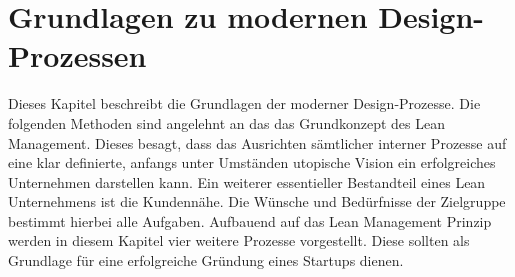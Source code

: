 \chapter{Grundlagen zu modernen Design-Prozessen}
\label{sec:Grundlagen}
Dieses Kapitel beschreibt die Grundlagen der moderner Design-Prozesse. Die folgenden Methoden sind angelehnt an das das Grundkonzept des Lean Management. Dieses besagt, dass das Ausrichten sämtlicher interner Prozesse auf eine klar definierte, anfangs unter Umständen utopische Vision ein erfolgreiches Unternehmen darstellen kann. Ein weiterer essentieller Bestandteil eines Lean Unternehmens ist die Kundennähe. Die Wünsche und Bedürfnisse der Zielgruppe bestimmt hierbei alle Aufgaben.\cite{LeanManagement} Aufbauend auf das Lean Management Prinzip werden in diesem Kapitel vier weitere Prozesse vorgestellt. Diese sollten als Grundlage für eine erfolgreiche Gründung eines Startups dienen.





